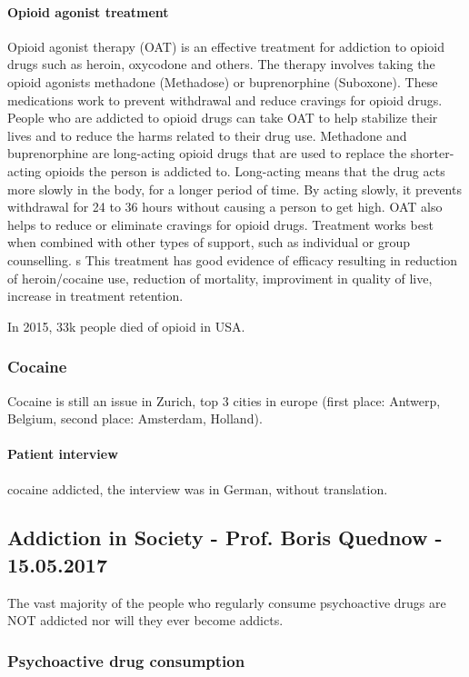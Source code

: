 \documentclass[12pt,article,oneside,a4paper]{memoir}
\begin{document}
\paragraph{Opioid agonist treatment}
Opioid agonist therapy (OAT) is an effective treatment for addiction to opioid drugs such as heroin, oxycodone and others. The therapy involves taking the opioid agonists methadone (Methadose) or buprenorphine (Suboxone). These medications work to prevent withdrawal and reduce cravings for opioid drugs. People who are addicted to opioid drugs can take OAT to help stabilize their lives and to reduce the harms related to their drug use. 
Methadone and buprenorphine are long-acting opioid drugs that are used to replace the shorter-acting opioids the person is addicted to. Long-acting means that the drug acts more slowly in the body, for a longer period of time. By acting slowly, it prevents withdrawal for 24 to 36 hours without causing a person to get high. OAT also helps to reduce or eliminate cravings for opioid drugs. Treatment works best when combined with other types of support, such as individual or group counselling. 
s
This treatment has good evidence of efficacy resulting in reduction of heroin/cocaine use, reduction of mortality, improviment in quality of live, increase in treatment retention.

In 2015, 33k people died of opioid in USA.

\subsubsection{Cocaine}
Cocaine is still an issue in Zurich, top 3 cities in europe (first place: Antwerp, Belgium, second place: Amsterdam, Holland).

\paragraph{Patient interview} cocaine addicted, the interview was in German, without translation.

\subsection{Addiction in Society - Prof. Boris Quednow - 15.05.2017}

The vast majority of the people who regularly consume psychoactive drugs are NOT addicted nor will they ever become addicts.

\subsubsection{Psychoactive drug consumption}
\end{document}
